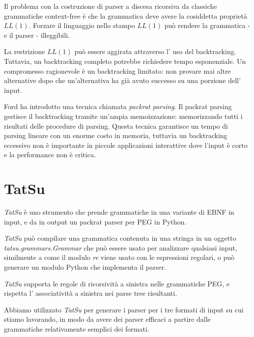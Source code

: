 Il problema con la costruzione di parser a discesa ricorsiva da classiche grammatiche context-free è che la grammatica deve avere la cosiddetta proprietà $LL(1)$. Forzare il linguaggio nello stampo $LL(1)$ può rendere la grammatica - e il parser - illeggibili.

La restrizione $LL(1)$ può essere aggirata attraverso l' uso del backtracking. Tuttavia, un backtracking completo potrebbe richiedere tempo esponenziale. Un compromesso ragionevole è un backtracking limitato: non provare mai altre alternative dopo che un'alternativa ha già avuto successo su una porzione dell' input.

Ford \cite{brianford, brianford2} ha introdotto una tecnica chiamata \textit{packrat parsing}. Il packrat parsing gestisce il backtracking tramite un'ampia memoizzazione: memorizzando tutti i risultati delle procedure di parsing. Questa tecnica garantisce un tempo di parsing lineare con un enorme costo in memoria, tuttavia un backtracking eccessivo non è importante in piccole applicazioni interattive dove l'input è corto e la performance non è critica. \cite{roman}

\section{TatSu}
\textit{TatSu} è uno strumento che prende grammatiche in una variante di EBNF in input, e da in output un packrat parser per PEG in Python.

\textit{TatSu} può compilare una grammatica contenuta in una stringa in un oggetto \textit{tatsu.grammars.Grammar} che può essere usato per analizzare qualsiasi input, similmente a come il modulo \textit{re} viene usato con le espressioni regolari, o può generare un modulo Python che implementa il parser.


\textit{TatSu} supporta le regole di ricorsività a sinistra nelle grammatiche PEG, e rispetta l' associatività a sinistra nei parse tree risultanti.

Abbiamo utilizzato \textit{TatSu} per generare i parser per i tre formati di input su cui stiamo lavorando, in modo da avere dei parser efficaci a partire dalle grammatiche relativamente semplici dei formati.